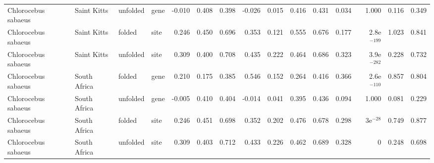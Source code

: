 \begin{longtable}{llllrrrrrrrrrrr}
 Chlorocebus sabaeus &               Saint Kitts &  unfolded &  gene &                             -0.010 &                               0.408 &                 0.398 &                -0.026 &                              0.015 &                               0.416 &                 0.431 &                 0.034 &         1.000 &  0.116 &  0.349 \\
 Chlorocebus sabaeus &               Saint Kitts &    folded &  site &                              0.246 &                               0.450 &                 0.696 &                 0.353 &                              0.121 &                               0.555 &                 0.676 &                 0.177 & 2.8e$^{-199}$ &  1.023 &  0.841 \\
 Chlorocebus sabaeus &               Saint Kitts &  unfolded &  site &                              0.309 &                               0.400 &                 0.708 &                 0.435 &                              0.222 &                               0.464 &                 0.686 &                 0.323 & 3.9e$^{-282}$ &  0.228 &  0.732 \\
 Chlorocebus sabaeus &              South Africa &    folded &  gene &                              0.210 &                               0.175 &                 0.385 &                 0.546 &                              0.152 &                               0.264 &                 0.416 &                 0.366 & 2.6e$^{-110}$ &  0.857 &  0.804 \\
 Chlorocebus sabaeus &              South Africa &  unfolded &  gene &                             -0.005 &                               0.410 &                 0.404 &                -0.014 &                              0.041 &                               0.395 &                 0.436 &                 0.094 &         1.000 &  0.081 &  0.229 \\
 Chlorocebus sabaeus &              South Africa &    folded &  site &                              0.246 &                               0.451 &                 0.698 &                 0.352 &                              0.202 &                               0.476 &                 0.678 &                 0.298 &    3e$^{-28}$ &  0.749 &  0.877 \\
 Chlorocebus sabaeus &              South Africa &  unfolded &  site &                              0.309 &                               0.403 &                 0.712 &                 0.433 &                              0.226 &                               0.462 &                 0.689 &                 0.328 &             0 &  0.248 &  0.698 \\

\end{longtable}
